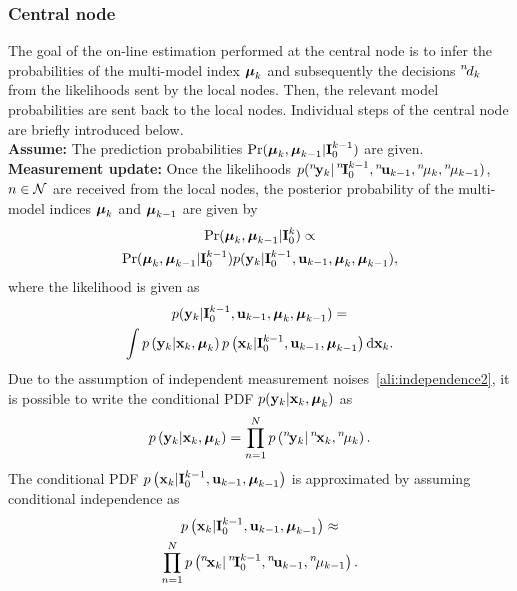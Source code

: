 \documentclass[conference,10pt]{IEEEtran}
\def\nth{\prescript{n\!}{}}
\begin{document}
\subsubsection{Central node}\label{sec:central_node}
The goal of the on-line estimation performed at the central node is to infer the probabilities of the multi-model index $\boldsymbol{\mu}_k$ and subsequently the decisions $\nth{d}_k$ from the likelihoods sent by the local nodes. 
Then, the relevant model probabilities are sent back to the local nodes.
Individual steps of the central node are briefly introduced below.\\
\textbf{Assume:} The prediction probabilities $\Pr(\boldsymbol{\mu}_{k},\boldsymbol{\mu}_{k-1}|\mathbf{I}_0^{k-1})$ are given.\\
\textbf{Measurement update:} Once the likelihoods $p(\nth{\bfy}_k\vert\nth{\bfI}_0^{k-1},\nth{\bfu}_{k-1},\nth{\mu}_k,\nth{\mu}_{k-1})$, $n\in\mathcal{N}$ are received from the local nodes, the posterior probability of the multi-model indices $\boldsymbol{\mu}_k$ and $\boldsymbol{\mu}_{k-1}$ are given by 
\begin{multline}\label{ali:Prob_Posterior}
	\Pr(\boldsymbol{\mu}_{k},\boldsymbol{\mu}_{k-1}|\mathbf{I}_0^{k}) \propto\\ \Pr(\boldsymbol{\mu}_{k},\boldsymbol{\mu}_{k-1}|\mathbf{I}_0^{k-1}) p(\mathbf{y}_{k}|\mathbf{I}_0^{k-1},\mathbf{u}_{k-1},\boldsymbol{\mu}_{k},\boldsymbol{\mu}_{k-1}),
\end{multline}
where  the likelihood is given as
\begin{multline}
	p(\mathbf{y}_{k}|\mathbf{I}_0^{k-1},\mathbf{u}_{k-1},\boldsymbol{\mu}_{k},\boldsymbol{\mu}_{k-1}) =\\
	\int p\left( \mathbf{y}_{k}|\mathbf{x}_{k},\boldsymbol{\mu}_{k} \right) p\left( \mathbf{x}_{k} |\mathbf{I}_{0}^{k-1},\mathbf{u}_{k-1},\boldsymbol{\mu}_{k-1} \right) \mathrm{d}\mathbf{x}_{k}.
\end{multline}
Due to the assumption of independent measurement noises~\eqref{ali:independence2}, it is possible to write the conditional PDF $p( \mathbf{y}_{k}|\mathbf{x}_{k},\boldsymbol{\mu}_{k} )$ as
\begin{align}
	p\left( \bfy_{k}|\bfx_{k},\bfmu_{k} \right) = \prod_{n=1}^{N} p\left( \nth{\bfy}_{k}|\nth{\bfx}_{k},\nth{\mu}_{k} \right).
\end{align}
The conditional PDF $p\left( \mathbf{x}_{k} |\mathbf{I}_{0}^{k-1},\mathbf{u}_{k-1},\boldsymbol{\mu}_{k-1} \right)$ is approximated by assuming conditional independence as
\begin{multline}
	p\left( \bfx_{k} |\bfI_{0}^{k-1},\bfu_{k-1},\bfmu_{k-1} \right) \approx\\
	\prod_{n=1}^{N} p\left( \nth{\bfx}_{k} | \nth{\bfI}_{0}^{k-1},\nth{\bfu}_{k-1},\nth{\mu}_{k-1} \right).
\end{multline}
\end{document}
